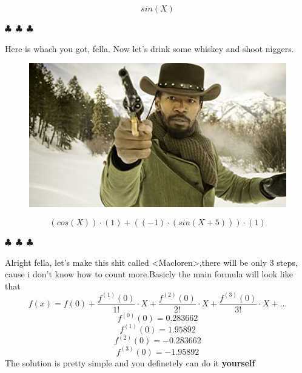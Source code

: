 \documentclass{article}
\begin{document}
\begin{equation}
{sin({X})}
\end{equation}
\begin{center} $\clubsuit$~$\clubsuit$~$\clubsuit$ \end{center}Here is whach you got, fella. Now let's drink some whiskey and shoot niggers.\begin{figure}[H] \includegraphics[scale=0.6]{funny_pics/slave.jpg} \end{figure}
\begin{equation}
{{({cos({X})})\cdot({1})}+{({({-1})\cdot({sin({{X}+{5}})})})\cdot({1})}}
\end{equation}
\begin{center} $\clubsuit$~$\clubsuit$~$\clubsuit$ \end{center}Alright fella, let's make this shit called <Macloren>,there will be only 3 steps, cause i don't know how to count more.Basicly the main formula will look like that
 \[ f(x) = f(0) + \frac{f^{(1)}(0)}{1!}\cdot X + \frac{f^{(2)}(0)}{2!}\cdot X + \frac{f^{(3)}(0)}{3!}\cdot X + \text{...}\]
\[ f^{(0)}(0) = 0.283662\]\[ f^{(1)}(0) = 1.95892\]\[ f^{(2)}(0) = -0.283662\]\[ f^{(3)}(0) = -1.95892\]
        The solution is pretty simple and you definetely can do it \textbf{yourself}
        
\end{document}
